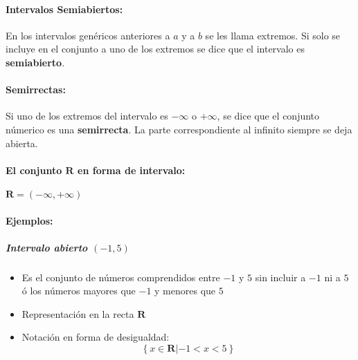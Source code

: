 \paragraph{Intervalos Semiabiertos:} En los intervalos genéricos anteriores a $a$ y a $b$ se les llama extremos. Si solo se incluye en el conjunto a uno de los extremos se dice que el intervalo es \textbf{semiabierto}.


\paragraph{Semirrectas:} Si uno de los extremos del intervalo es $-\infty$ o $+\infty$, se dice que el conjunto númerico es una \textbf{semirrecta}. La parte correspondiente al infinito siempre se deja abierta.

\paragraph{El conjunto $\mathbf{R}$ en forma de intervalo:} $\mathbf{R}=\left(-\infty,+\infty\right)$

\paragraph{Ejemplos:}
\subparagraph{Intervalo abierto $\left(-1,5\right)$}
\begin{itemize}
    \item Es el conjunto de números comprendidos entre $-1$ y $5$ sin incluir a $-1$ ni a $5$ ó los números mayores que $-1$ y menores que $5$
    \item Representación en la recta $\mathbf{R}$ \vfill 
    \item Notación en forma de desigualdad: $$\left\{x \in \mathbf{R} | -1<x<5 \right\} $$
\end{itemize}

